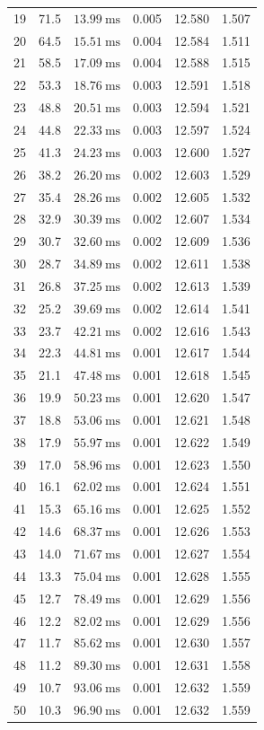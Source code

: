 \documentclass[11pt,a4paper]{article}
\begin{document}
\begin{longtable}{@{}r r r r r r@{}}
19 & 71.5 & $13.99~\mathrm{ms}$ & 0.005 & 12.580 & 1.507 \\
20 & 64.5 & $15.51~\mathrm{ms}$ & 0.004 & 12.584 & 1.511 \\
21 & 58.5 & $17.09~\mathrm{ms}$ & 0.004 & 12.588 & 1.515 \\
22 & 53.3 & $18.76~\mathrm{ms}$ & 0.003 & 12.591 & 1.518 \\
23 & 48.8 & $20.51~\mathrm{ms}$ & 0.003 & 12.594 & 1.521 \\
24 & 44.8 & $22.33~\mathrm{ms}$ & 0.003 & 12.597 & 1.524 \\
25 & 41.3 & $24.23~\mathrm{ms}$ & 0.003 & 12.600 & 1.527 \\
26 & 38.2 & $26.20~\mathrm{ms}$ & 0.002 & 12.603 & 1.529 \\
27 & 35.4 & $28.26~\mathrm{ms}$ & 0.002 & 12.605 & 1.532 \\
28 & 32.9 & $30.39~\mathrm{ms}$ & 0.002 & 12.607 & 1.534 \\
29 & 30.7 & $32.60~\mathrm{ms}$ & 0.002 & 12.609 & 1.536 \\
30 & 28.7 & $34.89~\mathrm{ms}$ & 0.002 & 12.611 & 1.538 \\
31 & 26.8 & $37.25~\mathrm{ms}$ & 0.002 & 12.613 & 1.539 \\
32 & 25.2 & $39.69~\mathrm{ms}$ & 0.002 & 12.614 & 1.541 \\
33 & 23.7 & $42.21~\mathrm{ms}$ & 0.002 & 12.616 & 1.543 \\
34 & 22.3 & $44.81~\mathrm{ms}$ & 0.001 & 12.617 & 1.544 \\
35 & 21.1 & $47.48~\mathrm{ms}$ & 0.001 & 12.618 & 1.545 \\
36 & 19.9 & $50.23~\mathrm{ms}$ & 0.001 & 12.620 & 1.547 \\
37 & 18.8 & $53.06~\mathrm{ms}$ & 0.001 & 12.621 & 1.548 \\
38 & 17.9 & $55.97~\mathrm{ms}$ & 0.001 & 12.622 & 1.549 \\
39 & 17.0 & $58.96~\mathrm{ms}$ & 0.001 & 12.623 & 1.550 \\
40 & 16.1 & $62.02~\mathrm{ms}$ & 0.001 & 12.624 & 1.551 \\
41 & 15.3 & $65.16~\mathrm{ms}$ & 0.001 & 12.625 & 1.552 \\
42 & 14.6 & $68.37~\mathrm{ms}$ & 0.001 & 12.626 & 1.553 \\
43 & 14.0 & $71.67~\mathrm{ms}$ & 0.001 & 12.627 & 1.554 \\
44 & 13.3 & $75.04~\mathrm{ms}$ & 0.001 & 12.628 & 1.555 \\
45 & 12.7 & $78.49~\mathrm{ms}$ & 0.001 & 12.629 & 1.556 \\
46 & 12.2 & $82.02~\mathrm{ms}$ & 0.001 & 12.629 & 1.556 \\
47 & 11.7 & $85.62~\mathrm{ms}$ & 0.001 & 12.630 & 1.557 \\
48 & 11.2 & $89.30~\mathrm{ms}$ & 0.001 & 12.631 & 1.558 \\
49 & 10.7 & $93.06~\mathrm{ms}$ & 0.001 & 12.632 & 1.559 \\
50 & 10.3 & $96.90~\mathrm{ms}$ & 0.001 & 12.632 & 1.559 \\
\end{longtable}
\normalsize
\end{document}
